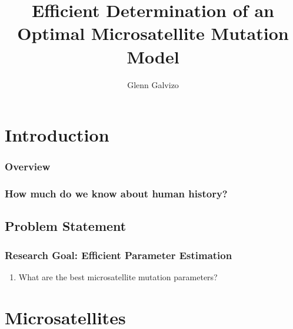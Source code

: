 \documentclass[11pt]{beamer}
\author{Glenn Galvizo}
\title{Efficient Determination of an Optimal Microsatellite Mutation Model}
\institute{University of Hawaii at Manoa}
\begin{document}
    \begin{frame}
        \titlepage
    \end{frame}

	\section{Introduction}\label{sec:i}
	\begin{frame}
		\frametitle{Overview}
        \tableofcontents
	\end{frame}

	\begin{frame}
		\frametitle{How much do we know about human history?}
	\end{frame}

	\subsection{Problem Statement}\label{subsec:ps}
	\begin{frame}
		\frametitle{Research Goal: Efficient Parameter Estimation}
        \begin{enumerate}
            \item What are the best microsatellite mutation parameters?
        \end{enumerate}
	\end{frame}

	\section{Microsatellites}\label{sec:mi}
\end{document}
